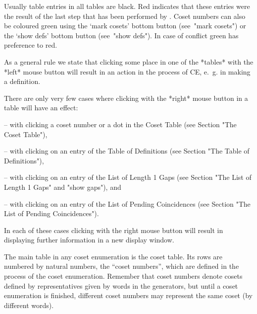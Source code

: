 


Usually table entries in all tables are black. Red indicates that
these entries were the result of the last step that has been performed
by {\ITC}. Coset numbers can also be coloured green using the `mark
cosets' bottom button (see~"mark cosets") or the `show defs' bottom
button (see~"show defs"). In case of conflict green has preference to
red.

As a general rule we state that clicking some place in one of the
*tables* with the *left* mouse button will result in an action in the
process of CE, e.~g. in making a definition.

There are only very few cases where clicking with the *right* mouse
button in a table will have an effect:

\beginlist

\item{--}
  with clicking a coset number or a dot in the Coset Table (see Section
  "The Coset Table"),

\item{--}
  with clicking on an entry of the Table of Definitions (see Section
  "The Table of Definitions"),

\item{--}
  with clicking on an entry of the List of Length 1 Gaps (see Section
  "The List of Length 1 Gaps" and "show gaps"), and

\item{--}
  with clicking on an entry of the List of Pending Coincidences (see
  Section "The List of Pending Coincidences").

\endlist

In each of these cases clicking with the right mouse button will
result in {\ITC} displaying further information in a new display
window.



The main table in any coset enumeration is the coset table. Its rows
are numbered by natural numbers, the ``coset numbers'', which are
defined in the process of the coset enumeration. Remember that coset
numbers denote cosets defined by representatives given by words in
the generators, but until a coset
enumeration is finished, different coset numbers may represent the
same coset (by different words).

